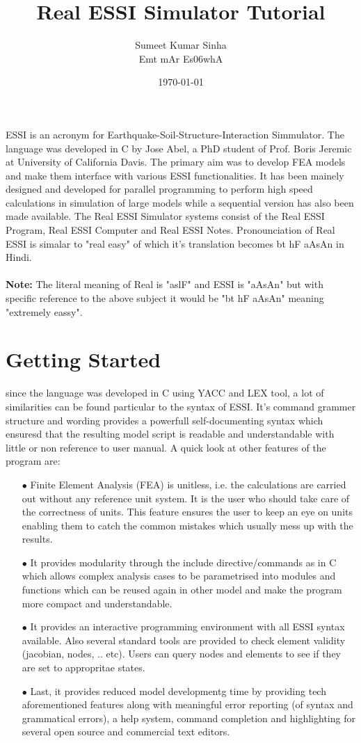 \documentclass{article}
\title{Real ESSI Simulator Tutorial}
\author{Sumeet Kumar Sinha \\ {\dn \7{s}Emt \7{k}mAr Es\306whA }  }
\date{\today}
\begin{document}
\maketitle
ESSI is an acronym for Earthquake-Soil-Structure-Interaction Simmulator. The language was developed in C by Jose Abel, a PhD student of Prof. Boris Jeremic at University of California Davis. The primary aim was to develop FEA models and make them interface with various ESSI functionalities. It has been mainely designed and developed for parallel programming to perform high speed calculations in simulation of large models while a sequential version has also been made available. The Real ESSI Simulator systems consist of the Real ESSI Program, Real ESSI Computer and Real ESSI Notes. Pronounciation of Real ESSI is simalar to "real easy" of which it's translation becomes {\dn bt hF aAsAn} in Hindi. 
\\
\\
\textbf{Note:} The literal meaning of Real is "{\dn aslF}" and ESSI is "{\dn aAsAn}" but with specific reference to the above subject it would be "{\dn bt hF aAsAn}" meaning "extremely eassy".

\section {Getting Started} 
since the language was developed in C using YACC and LEX tool, a lot of similarities can be found particular to the syntax of ESSI. It's command grammer structure and wording provides a powerfull self-documenting syntax which ensuresd that the resulting model script is readable and understandable with little or non reference to user manual. A quick look at other features of the program are:

\begin{itemize}
  \item[$\bullet$] Finite Element Analysis (FEA) is unitless, i.e. the calculations are carried out without any reference unit system. It is the user who should take care of the correctness of units. This feature ensures the user to keep an eye on units enabling them to catch the common mistakes which usually mess up with the results.  
  \item[$\bullet$] It provides modularity through the include directive/commands as in C which allows complex analysis cases to be parametrised into modules and functions which can be reused again in other model and make the program more compact and understandable.
  \item[$\bullet$] It provides an interactive programming environment with all ESSI syntax available. Also several standard tools are provided to check element validity (jacobian, nodes, .. etc). Users can query nodes and elements to see if they are set to appropritae states.
  \item[$\bullet$] Last, it provides reduced model developmentg time by providing tech aforementioned features along with meaningful error reporting (of syntax and grammatical errors), a help system, command completion and highlighting for several open source and commercial text editors.
\end {itemize}
\end{document}
